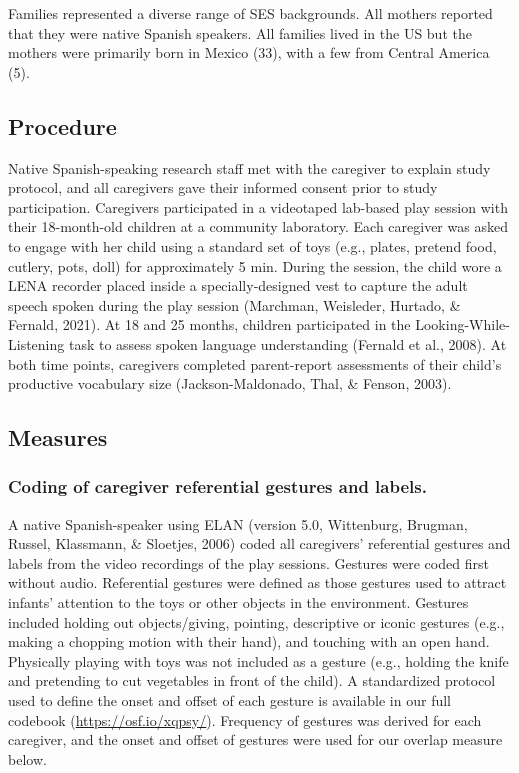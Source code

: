 \documentclass[
  man,mask,floatsintext]{apa6}
\begin{document}
Families represented a diverse range of SES backgrounds. All mothers reported that they were native Spanish speakers. All families lived in the US but the mothers were primarily born in Mexico (33), with a few from Central America (5).

\hypertarget{procedure}{%
\subsection{Procedure}\label{procedure}}

Native Spanish-speaking research staff met with the caregiver to explain study protocol, and all caregivers gave their informed consent prior to study participation. Caregivers participated in a videotaped lab-based play session with their 18-month-old children at a community laboratory. Each caregiver was asked to engage with her child using a standard set of toys (e.g., plates, pretend food, cutlery, pots, doll) for approximately 5 min. During the session, the child wore a LENA recorder placed inside a specially-designed vest to capture the adult speech spoken during the play session (Marchman, Weisleder, Hurtado, \& Fernald, 2021). At 18 and 25 months, children participated in the Looking-While-Listening task to assess spoken language understanding (Fernald et al., 2008). At both time points, caregivers completed parent-report assessments of their child's productive vocabulary size (Jackson-Maldonado, Thal, \& Fenson, 2003).

\hypertarget{measures}{%
\subsection{Measures}\label{measures}}

\hypertarget{coding-of-caregiver-referential-gestures-and-labels.}{%
\subsubsection{Coding of caregiver referential gestures and labels.}\label{coding-of-caregiver-referential-gestures-and-labels.}}

A native Spanish-speaker using ELAN (version 5.0, Wittenburg, Brugman, Russel, Klassmann, \& Sloetjes, 2006) coded all caregivers' referential gestures and labels from the video recordings of the play sessions. Gestures were coded first without audio. Referential gestures were defined as those gestures used to attract infants' attention to the toys or other objects in the environment. Gestures included holding out objects/giving, pointing, descriptive or iconic gestures (e.g., making a chopping motion with their hand), and touching with an open hand. Physically playing with toys was not included as a gesture (e.g., holding the knife and pretending to cut vegetables in front of the child). A standardized protocol used to define the onset and offset of each gesture is available in our full codebook (\url{https://osf.io/xqpsy/}). Frequency of gestures was derived for each caregiver, and the onset and offset of gestures were used for our overlap measure below.
\end{document}
